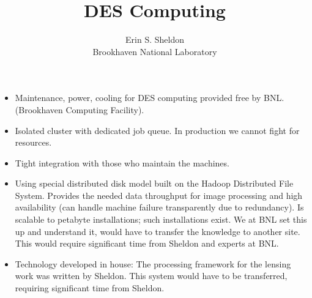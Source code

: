 \documentclass[12pt]{article}
\title{DES Computing}
\author{Erin S. Sheldon\\
Brookhaven National Laboratory}
\date{}
\begin{document}
\maketitle

\begin{itemize}


    \item Maintenance, power, cooling for DES computing provided free by BNL.
    (Brookhaven Computing Facility).

    \item Isolated cluster with dedicated job queue.   In production we cannot
    fight for resources.

    \item Tight integration with those who maintain the machines.

    \item Using special distributed disk model built on the Hadoop Distributed
    File System.  Provides the needed data throughput for image processing and
    high availability (can handle machine failure transparently due to
    redundancy).  Is scalable to petabyte installations; such installations
    exist.  We at BNL set this up and understand it, would have to transfer the
    knowledge to another site.  This would require significant time from
    Sheldon and experts at BNL.

    \item Technology developed in house: The processing framework for the
    lensing work was written by Sheldon.  This system would have to be
    transferred, requiring significant time from Sheldon.
    

\end{itemize}
\end{document}
